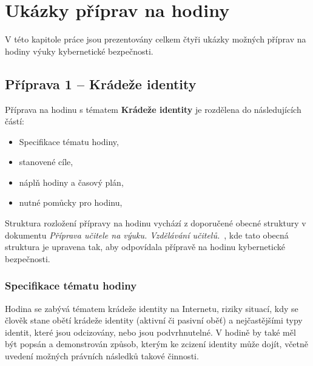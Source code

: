 \documentclass[a4paper, 12pt]{article}
\begin{document}
\newpage
\section{Ukázky příprav na hodiny}
V této kapitole práce jsou prezentovány celkem čtyři ukázky možných příprav na hodiny výuky kybernetické bezpečnosti.

\subsection{Příprava 1 -- Krádeže identity}
Příprava na hodinu s tématem \textbf{Krádeže identity} je rozdělena do následujících částí:
    \begin{itemize}
        \setlength{\itemsep}{-3pt}
        \item Specifikace tématu hodiny,
        \item stanovené cíle,
        \item náplň hodiny a časový plán,
        \item nutné pomůcky pro hodinu,
    \end{itemize}

Struktura rozložení přípravy na hodinu vychází z doporučené obecné struktury v dokumentu \textit{Příprava učitele na výuku. Vzdělávání učitelů.}~\cite{presentationPavlaZ}, kde tato obecná struktura je upravena tak, aby odpovídala přípravě na hodinu kybernetické bezpečnosti.

\subsubsection{Specifikace tématu hodiny}
Hodina se zabývá tématem krádeže identity na Internetu, riziky situací, kdy se člověk stane obětí krádeže identity (aktivní či pasivní oběť) a nejčastějšími typy identit, které jsou odcizovány, nebo jsou podvrhnutelné. V hodině by také měl být popsán a demonstrován způsob, kterým ke zcizení identity může dojít, včetně uvedení možných právních následků takové činnosti.
\end{document}
